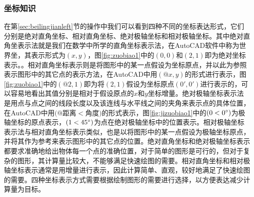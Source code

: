 \subsubsection{坐标知识}
在第\ref{sec:beilingjianleft}节的操作中我们可以看到四种不同的坐标表达形式，它们分别是绝对直角坐标、相对直角坐标、绝对极轴坐标和相对极轴坐标。其中绝对直角坐表示法就是我们在数学中所学的直角坐标表示法，在AutoCAD软件中称为世界坐，其表示形式为$(x,y)$，图\ref{fig:zuobiao1}中的$(0,0)$和$(2,1)$即为绝对坐标表示。。相对直角坐标表示则是将图形中的某一点假设为坐标原点，并以此为参照表示图形中的其它点的表示方法，在AutoCAD中用$(@x,y)$的形式进行表示，图\ref{fig:zuobiao1}中的$(@2,1)$即为将$(2,1)$假设为坐标原点$(0',0')$进行表示的，可以容易地看出其值分别是相对于假设原点的$x$和$y$坐标增量。绝对极轴坐标表示法是用点与点之间的线段长度以及该连线与水平线之间的夹角来表示点的具体位置，在AutoCAD中用$(@$距离$<$角度$)$的形式表示，图\ref{fig:jizuobiao1}中的$(0<0\degree)$为极轴坐标的原点表示，$(1<45\degree)$为点在绝对极轴坐标中的位置表示。相对极轴坐标表示法与相对直角坐标表示类似，也是以将图形中的某一点假设为极轴坐标原点，并将其作为参考来表示图形中的其它点的位置。绝对直角坐标和绝对极轴坐标表示都要求准确地给出物体每一个点的准确位置，对于简单的图形是可行的，但对于复杂的图形，其计算量比较大，不能够满足快速绘图的需要。相对直角坐标和相对极轴坐标表示通常是用增量进行表示，因此计算简单、直观，较好地满足了快速绘图的需要。四种坐标表示方式需要根据绘制图形的需要进行选择，以方便表达减少计算量为目标。
